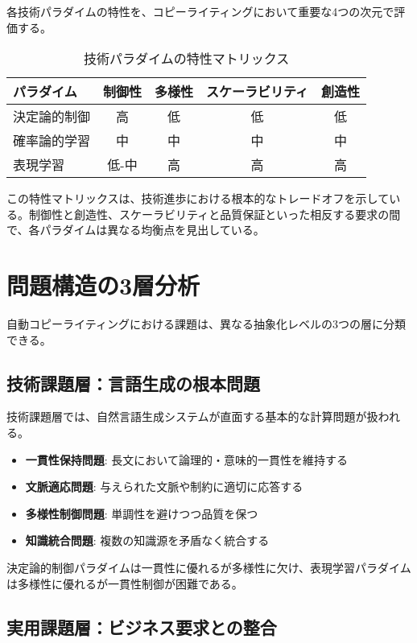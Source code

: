 \documentclass[11pt, a4paper]{article}
\begin{document}
各技術パラダイムの特性を、コピーライティングにおいて重要な4つの次元で評価する。

\begin{table}[h]
\centering
\begin{tabular}{|l|c|c|c|c|}
\hline
\textbf{パラダイム} & \textbf{制御性} & \textbf{多様性} & \textbf{スケーラビリティ} & \textbf{創造性} \\
\hline
決定論的制御 & 高 & 低 & 低 & 低 \\
\hline
確率論的学習 & 中 & 中 & 中 & 中 \\
\hline
表現学習 & 低-中 & 高 & 高 & 高 \\
\hline
\end{tabular}
\caption{技術パラダイムの特性マトリックス}
\end{table}

この特性マトリックスは、技術進歩における根本的なトレードオフを示している。制御性と創造性、スケーラビリティと品質保証といった相反する要求の間で、各パラダイムは異なる均衡点を見出している。

\section{問題構造の3層分析}

自動コピーライティングにおける課題は、異なる抽象化レベルの3つの層に分類できる。

\subsection{技術課題層：言語生成の根本問題}

技術課題層では、自然言語生成システムが直面する基本的な計算問題が扱われる。

\begin{itemize}[noitemsep,topsep=0pt]
    \item \textbf{一貫性保持問題}: 長文において論理的・意味的一貫性を維持する
    \item \textbf{文脈適応問題}: 与えられた文脈や制約に適切に応答する
    \item \textbf{多様性制御問題}: 単調性を避けつつ品質を保つ
    \item \textbf{知識統合問題}: 複数の知識源を矛盾なく統合する
\end{itemize}

決定論的制御パラダイムは一貫性に優れるが多様性に欠け、表現学習パラダイムは多様性に優れるが一貫性制御が困難である。

\subsection{実用課題層：ビジネス要求との整合}
\end{document}
